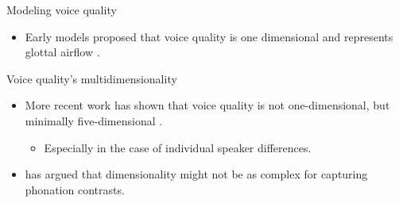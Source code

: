 \documentclass[professionalfont]{beamer}
\begin{document}
\begin{frame}{Modeling voice quality}
  \begin{itemize}
    \item Early models proposed that voice quality is one dimensional and represents glottal airflow \citep{ladefogedPreliminariesLinguisticPhonetics1971,ladefogedSoundsWorldsLanguages1996}.
  \end{itemize}
  \begin{figure}[h!]
\end{figure}
\end{frame}

\begin{frame}{Voice quality's multidimensionality}
  \begin{itemize}
    \item More recent work has shown that voice quality is not one-dimensional, but minimally five-dimensional \citep[e.g.,][]{garellekModelingVoiceSource2016,kreimanValidatingPsychoacousticModel2021}.
    \begin{itemize}
      \item Especially in the case of individual speaker differences.
    \end{itemize}
    \item \citet{garellekVoiceQualityTone2013} has argued that dimensionality might not be as complex for capturing phonation contrasts.
  \end{itemize}
\end{frame}
\end{document}
